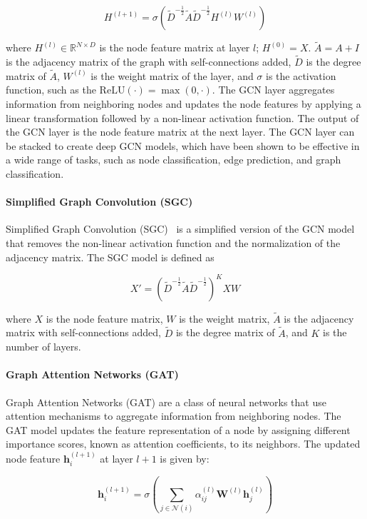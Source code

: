 $$ 
 H^{(l+1)} = \sigma(\tilde{D}^{-\frac{1}{2}}\tilde{A}\tilde{D}^{-\frac{1}{2}}H^{(l)}W^{(l)})
$$

where $H^{(l)}\in \mathbb{R}^{N\times D}$ is the node feature matrix at layer $l$; $H^{(0)} = X$. $\tilde{A} = A + I$ is the adjacency matrix of the graph with self-connections added, $\tilde{D}$ is the degree matrix of $\tilde{A}$, $W^{(l)}$ is the weight matrix of the layer, and $\sigma$ is the activation function, such as the $\textrm{ReLU}(\cdot)=\max(0,\cdot)$. The GCN layer aggregates information from neighboring nodes and updates the node features by applying a linear transformation followed by a non-linear activation function. The output of the GCN layer is the node feature matrix at the next layer. The GCN layer can be stacked to create deep GCN models, which have been shown to be effective in a wide range of tasks, such as node classification, edge prediction, and graph classification.


\paragraph{Simplified Graph Convolution (SGC)}

Simplified Graph Convolution (SGC)~\cite{wu2019simplifying} is a simplified version of the GCN model that removes the non-linear activation function and the normalization of the adjacency matrix. The SGC model is defined as

$$
 X' = (\tilde{D}^{-\frac{1}{2}}\tilde{A}\tilde{D}^{-\frac{1}{2}})^K XW
$$

where $X$ is the node feature matrix, $W$ is the weight matrix, $\tilde{A}$ is the adjacency matrix with self-connections added, $\tilde{D}$ is the degree matrix of $\tilde{A}$, and $K$ is the number of layers. 


\paragraph{Graph Attention Networks (GAT)}
Graph Attention Networks (GAT) are a class of neural networks that use attention mechanisms to aggregate information from neighboring nodes. The GAT model updates the feature representation of a node by assigning different importance scores, known as attention coefficients, to its neighbors. The updated node feature $\mathbf{h}_i^{(l+1)}$ at layer $l+1$ is given by:

$$
\mathbf{h}_i^{(l+1)} = \sigma \left( \sum_{j \in \mathcal{N}(i)} \alpha_{ij}^{(l)} \mathbf{W}^{(l)} \mathbf{h}_j^{(l)} \right)
$$

